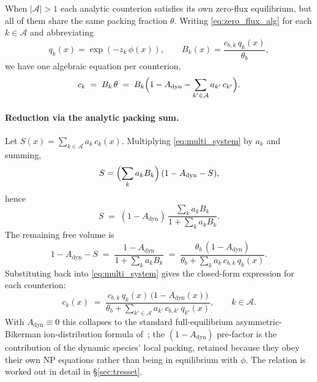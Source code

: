 \documentclass[11pt]{article}
\newcommand{\anset}{\mathcal{A}}       %
\begin{document}
When $|\anset| > 1$ each analytic counterion satisfies its own
zero-flux equilibrium, but all of them share the same packing
fraction $\theta$. Writing
\eqref{eq:zero_flux_alg} for each $k\in\anset$ and abbreviating
\begin{equation}
q_k(x) = \exp(-z_k\,\phi(x)),
\qquad
B_k(x) = \frac{c_{b,k}\,q_k(x)}{\theta_b},
\end{equation}
we have one algebraic equation per counterion,
\begin{equation}
c_k \;=\; B_k\,\theta
\;=\; B_k\Bigl(1 - A_{\mathrm{dyn}} - \sum_{k'\in\anset} a_{k'}\,c_{k'}\Bigr).
\label{eq:multi_system}
\end{equation}

\paragraph{Reduction via the analytic packing sum.}
Let $S(x) = \sum_{k\in\anset} a_k\,c_k(x)$. Multiplying
\eqref{eq:multi_system} by $a_k$ and summing,
\begin{equation}
S = \Bigl(\sum_k a_k B_k\Bigr)\,
   (1 - A_{\mathrm{dyn}} - S),
\end{equation}
hence
\begin{equation}
S \;=\; (1 - A_{\mathrm{dyn}})\,
\frac{\sum_k a_k B_k}{1 + \sum_k a_k B_k}.
\end{equation}
The remaining free volume is
\begin{equation}
1 - A_{\mathrm{dyn}} - S
\;=\; \frac{1 - A_{\mathrm{dyn}}}{1 + \sum_k a_k B_k}
\;=\; \frac{\theta_b\,(1-A_{\mathrm{dyn}})}
           {\theta_b + \sum_k a_k\,c_{b,k}\,q_k(x)}.
\label{eq:shared_freevol}
\end{equation}
Substituting back into \eqref{eq:multi_system} gives the closed-form
expression for each counterion:
\begin{equation}
\boxed{\;
c_k(x) \;=\;
\frac{c_{b,k}\,q_k(x)\,\bigl(1-A_{\mathrm{dyn}}(x)\bigr)}
     {\theta_b + \sum_{k'\in\anset} a_{k'}\,c_{b,k'}\,q_{k'}(x)},
\qquad k\in\anset.
\;}
\label{eq:multi_closure}
\end{equation}
With $A_{\mathrm{dyn}}\equiv 0$ this collapses to the standard
full-equilibrium asymmetric-Bikerman ion-distribution formula
of~\cite{Tresset2008}; the $(1-A_{\mathrm{dyn}})$ pre-factor is the
contribution of the dynamic species' local packing, retained because
they obey their own NP equations rather than being in equilibrium
with $\phi$. The relation is worked out in detail in
\S\ref{sec:tresset}.
\end{document}
